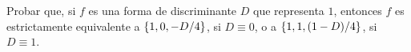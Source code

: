 \begin{ejerReducidas}\label{ejer:reducidas:representaciones:bisbis}
	Probar que, si $f$ es una forma de discriminante $D$ que
	representa $1$, entonces $f$ es estrictamente equivalente a
	$\left\{1,0,-D/4\right\}$, si $D\equiv 0$, o a
	$\left\{1,1,(1-D)/4\right\}$, si $D\equiv 1$.%
\end{ejerReducidas}

